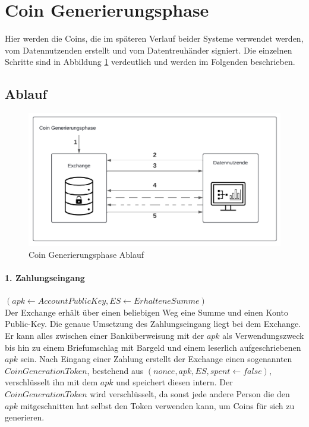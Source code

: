 \documentclass{scrreprt}
\begin{document}
\section{Coin Generierungsphase}
\label{system:coingeneration}
Hier werden die Coins, die im späteren Verlauf beider Systeme verwendet werden, vom Datennutzenden erstellt und vom Datentreuhänder signiert. Die einzelnen Schritte sind in Abbildung \ref{fig:coin-generationphase} verdeutlich und werden im Folgenden beschrieben.
\subsection{Ablauf}
\begin{figure}[H]
    \centering
    \includegraphics[width=0.9\linewidth]{CoinGenerationPhaseDiagramm.pdf}
    \caption{Coin Generierungsphase Ablauf}
    \label{fig:coin-generationphase}
\end{figure}

\paragraph{1. Zahlungseingang} $(apk \leftarrow AccountPublicKey, ES \leftarrow ErhalteneSumme)$\\
Der Exchange erhält über einen beliebigen Weg eine Summe und einen Konto Public-Key. Die genaue Umsetzung des Zahlungseingang liegt bei dem Exchange. Er kann alles zwischen einer Banküberweisung mit der $apk$ als Verwendungszweck bis hin zu einem Briefumschlag mit Bargeld und einem leserlich aufgeschriebenen $apk$ sein. Nach Eingang einer Zahlung erstellt der Exchange einen sogenannten $CoinGenerationToken$, bestehend aus $(nonce, apk, ES, spent \leftarrow false)$, verschlüsselt ihn mit dem $apk$ und speichert diesen intern. Der $CoinGenerationToken$ wird verschlüsselt, da sonst jede andere Person die den $apk$ mitgeschnitten hat selbst den Token verwenden kann, um Coins für sich zu generieren.
\end{document}
